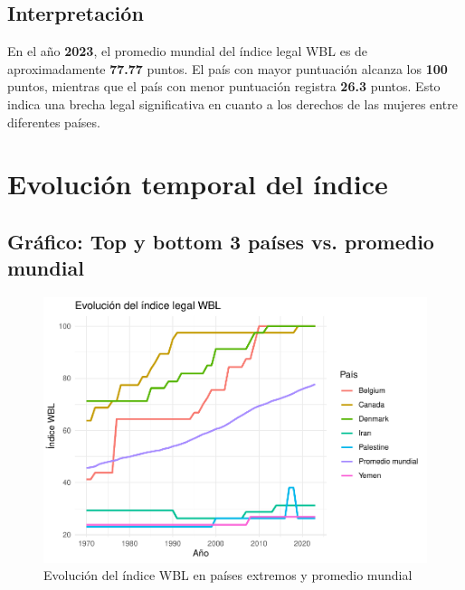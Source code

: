 \documentclass[11pt]{article}\usepackage[]{graphicx}\usepackage[]{xcolor}
\makeatletter
\def\maxwidth{ %
  \ifdim\Gin@nat@width>\linewidth
    \linewidth
  \else
    \Gin@nat@width
  \fi
}
\newenvironment{knitrout}{}{} %
\makeatother
\begin{document}
\subsection{Interpretación}

En el año \textbf{2023}, el promedio mundial del índice legal WBL es de aproximadamente \textbf{77.77} puntos.  
El país con mayor puntuación alcanza los \textbf{100} puntos, mientras que el país con menor puntuación registra \textbf{26.3} puntos.  
Esto indica una brecha legal significativa en cuanto a los derechos de las mujeres entre diferentes países.

\section{Evolución temporal del índice}

\subsection{Gráfico: Top y bottom 3 países vs. promedio mundial}

\begin{knitrout}
\color{fgcolor}\begin{figure}

{\centering \includegraphics[width=\maxwidth]{figure/grafico-1} 

}

\caption[Evolución del índice WBL en países extremos y promedio mundial]{Evolución del índice WBL en países extremos y promedio mundial}\label{fig:grafico}
\end{figure}

\end{knitrout}
\end{document}
